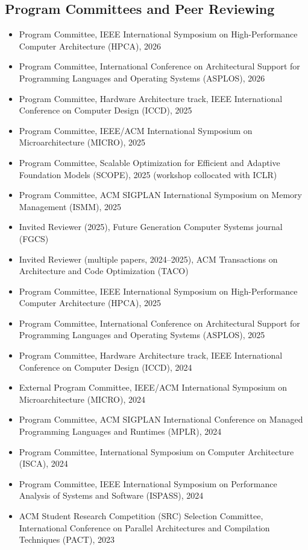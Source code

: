 \documentclass[11pt,a4paper,sans]{moderncv}
\begin{document}
\subsection{Program Committees and Peer Reviewing}
{\small
\begin{itemize}
\item Program Committee, IEEE International Symposium on High-Performance Computer Architecture (HPCA), 2026
\item Program Committee, International Conference on Architectural Support for Programming Languages and Operating Systems (ASPLOS), 2026
\item Program Committee, Hardware Architecture track, IEEE International Conference on Computer Design (ICCD), 2025 
\item Program Committee, IEEE/ACM International Symposium on Microarchitecture (MICRO), 2025
\item Program Committee, Scalable Optimization for Efficient and Adaptive Foundation Models (SCOPE), 2025 (workshop collocated with ICLR)
\item Program Committee, ACM SIGPLAN International Symposium on Memory Management (ISMM), 2025
\item Invited Reviewer (2025), Future Generation Computer Systems journal (FGCS)
\item Invited Reviewer (multiple papers, 2024--2025), ACM Transactions on Architecture and Code Optimization (TACO)
\item Program Committee, IEEE International Symposium on High-Performance Computer Architecture (HPCA), 2025
\item Program Committee, International Conference on Architectural Support for Programming Languages and Operating Systems (ASPLOS), 2025
\item Program Committee, Hardware Architecture track, IEEE International Conference on Computer Design (ICCD), 2024 
\item External Program Committee, IEEE/ACM International Symposium on Microarchitecture (MICRO), 2024
\item Program Committee, ACM SIGPLAN International Conference on Managed Programming Languages and Runtimes (MPLR), 2024
\item Program Committee, International Symposium on Computer Architecture (ISCA), 2024
\item Program Committee, IEEE International Symposium on Performance Analysis of Systems and Software (ISPASS), 2024
\item ACM Student Research Competition (SRC) Selection Committee, International Conference on Parallel Architectures and Compilation Techniques (PACT), 2023

\end{itemize}}
\end{document}
